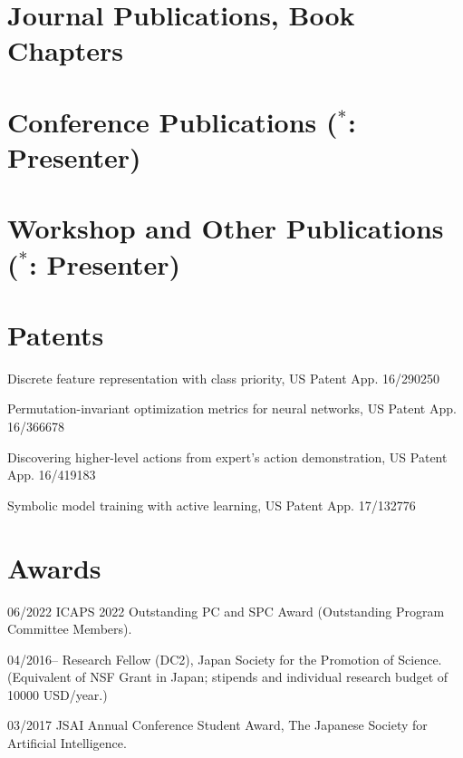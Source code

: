 \section{Journal Publications, Book Chapters}

\nocite{Asai2022}
\nocite{Asai2021}
\nocite{Asai2017}
\putbib

\section{Conference Publications ($^*$: Presenter)}

\nocite{carlos2024admissible}
\nocite{Asai2022b}
\nocite{Asai2022c}
\nocite{Asai2020}
\nocite{Asai2019a}
\nocite{Asai2019b}
\nocite{Asai2018}
\nocite{Asai2017e}
\nocite{Asai2017b}
\nocite{Asai2016b}
\nocite{Asai2016}
\nocite{Asai2015}
\nocite{Asai2014}
\putbib

\section{Workshop and Other Publications ($^*$: Presenter)}

\nocite{asaiphd}
\nocite{wissow2023scale}
\nocite{Asai2022d}
\nocite{asai2021generating}
\nocite{Asai2020b}
\nocite{Asai2020c}
\nocite{Asai2019c}
\nocite{Asai2018b}
\nocite{Asai2016c}
\nocite{Endo2016}
\nocite{Asai2014b}
\putbib


\section{Patents}

\begin{CV}
 \item Discrete feature representation with class priority, US Patent App. 16/290250
 \item Permutation-invariant optimization metrics for neural networks, US Patent App. 16/366678
 \item Discovering higher-level actions from expert's action demonstration, US Patent App. 16/419183
 \item Symbolic model training with active learning, US Patent App. 17/132776
\end{CV}

\section{Awards}

\begin{CV}
 \item[06/2022] ICAPS 2022 Outstanding PC and SPC Award (Outstanding Program Committee Members).

 \item[04/2016--] Research Fellow (DC2), Japan Society for the Promotion of Science.
 (Equivalent of NSF Grant in Japan; stipends and individual research budget of 10000 USD/year.)
 \item[03/2017]
 JSAI Annual Conference Student Award, The Japanese Society for Artificial Intelligence.
\end{CV}

